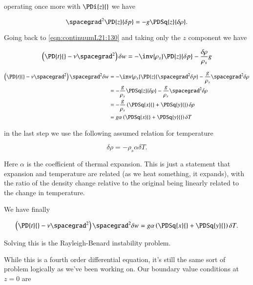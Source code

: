 operating once more with $\PDi{z}{}$ we have

\begin{equation}\label{eqn:continuumL21:210}
\spacegrad^2 \PD{z}{\delta p} = -g \PDSq{z}{\delta \rho}.
\end{equation}

Going back to \ref{eqn:continuumL21:130} and taking only the $z$ component we have

\begin{equation}\label{eqn:continuumL21:230}
\left( \PD{t}{} - \nu \spacegrad^2 \right) \delta w = -\inv{\rho_s} \PD{z}{\delta p} - \frac{\delta \rho}{\rho_s} g
\end{equation}

\begin{align*}
\left( \PD{t}{} - \nu \spacegrad^2 \right) \spacegrad^2 \delta w 
&= -\inv{\rho_s} \PD{z}{ \spacegrad^2 \delta p} - \frac{g}{\rho_s} \spacegrad^2 \delta \rho \\
&= -\frac{g}{\rho_s} \PDSq{z}{\delta \rho} - \frac{g}{\rho_s} \spacegrad^2 \delta \rho \\
&= 
-\frac{g}{\rho_s} \left( 
\PDSq{x}{}
+\PDSq{y}{}
\right)
\delta \rho \\
&=
g \alpha \left( 
\PDSq{x}{}
+\PDSq{y}{}
\right)
\delta T
\end{align*}

in the last step we use the following assumed relation for temperature

\begin{equation}\label{eqn:continuumL21:250}
\delta \rho = - \rho_s \alpha \delta T.
\end{equation}

Here $\alpha$ is the coefficient of thermal expansion.  This is just a statement that expansion and temperature are related (as we heat something, it expands), with the ratio of the density change relative to the original being linearly related to the change in temperature.

We have finally

\begin{equation}\label{eqn:continuumL21:290}
\left( \PD{t}{} - \nu \spacegrad^2 \right) \spacegrad^2 \delta w 
= 
g \alpha \left( 
\PDSq{x}{}
+\PDSq{y}{}
\right)
\delta T.
\end{equation}

Solving this is the Rayleigh-Benard instability problem.

While this is a fourth order differential equation, it's still the same sort of problem logically as we've been working on.  Our boundary value conditions at $z = 0$ are

